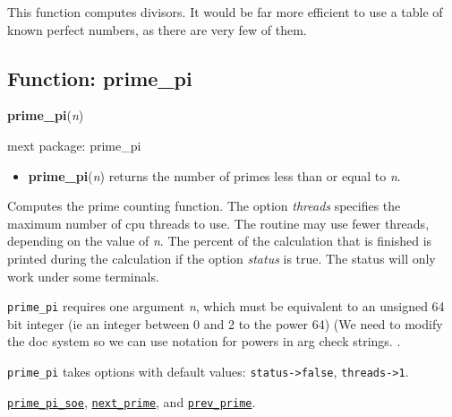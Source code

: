 \documentclass[]{article}
\begin{document}
\vspace{5 pt}


This function computes divisors. It would be far more efficient to use a table of known perfect numbers, as there are very few of them. 

\vspace{5 pt}


\subsection{Function: prime\_pi\label{sec:prime_pi}}
\hypertarget{prime_pi}{}
{\bf prime\_pi}({\it n})


\noindent mext package: prime\_pi



\vspace{5 pt}
\begin{itemize}
\item[] {\bf prime\_pi}({\it n})
  returns the number of primes less than or equal to {\it n}. 

\end{itemize}
Computes the prime counting function. The option {\it threads} specifies the maximum number of cpu threads to use. The routine may use fewer threads, depending on the value of {\it n}. The percent of the calculation that is finished is printed during the calculation if the option {\it status} is 
true. The status will only work under some terminals. 

\vspace{5 pt}

   {\tt prime\_pi} requires one argument {\it n}, which must be equivalent to an unsigned 64 bit integer
 (ie an integer between 0 and 2 to the power 64)
(We need to modify the doc system so we can use notation for powers in arg check strings.
.


\vspace{5 pt}

{\tt prime\_pi} takes options with default values: {\tt status->false}, {\tt threads->1}.
\vspace{5 pt}


  \hyperlink{prime_pi_soe}{{\tt prime\_pi\_soe}}, \hyperlink{next_prime}{{\tt next\_prime}}, and \hyperlink{prev_prime}{{\tt prev\_prime}}.

\vspace{5 pt}
\end{document}
